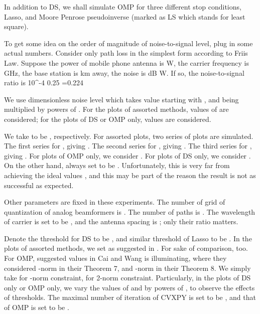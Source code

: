 In addition to DS, we shall simulate OMP for three different stop conditions, Lasso, and Moore Penrose pseudoinverse (marked as LS which stands for least square).

To get some idea on the order of magnitude of noise-to-signal level, plug in some actual numbers.
Consider only path loss in the simplest form according to Friis Law.
Suppose the power of mobile phone antenna is  W,
the carrier frequency is  GHz,
the base station is  km away,
the noise is  dB W.
If so, the noise-to-signal ratio is
 {
10^{-4}  {0.25} 
=0.224 \NR
}

We use dimensionless noise level \m {\s} which takes value starting with , and being multiplied by powers of .
For the plots of assorted methods,  values of \m {\s} are considered; for the plots of DS or OMP only,  values are considered.

We take  to be , respectively.
For assorted plots, two series of plots are simulated.
The first series for , giving .
The second series for , giving .
The third series for , giving .
For plots of OMP only, we consider .
For plots of DS only, we consider .
On the other hand,  always set to be .
Unfortunately, this is very far from achieving the ideal values , and this may be part of the reason the result is not as successful as expected.

Other parameters are fixed in these experiments.
The number of grid of quantization of analog beamformers is .
The number of paths  is .
The wavelength of carrier  is set to be , and the antenna spacing  is ; only their ratio matters.


Denote the threshold for DS to be , and similar threshold of Lasso to be .
In the plots of assorted methods, we set  as suggested in \cite {CaT07}.
For sake of comparison,  too.
For OMP, suggested values in Cai and Wang \cite {CaW11} is illuminating, where they considered -norm in their Theorem 7, and \m {\ell _\infty}-norm in their Theorem 8.
We simply take  for \m {\infty}-norm constraint,  for 2-norm constraint.
Particularly, in the plots of DS only or OMP only, we vary the values of  and  by powers of , to observe the effects of thresholds.
The maximal number of iteration of CVXPY is set to be , and that of OMP is set to be .

